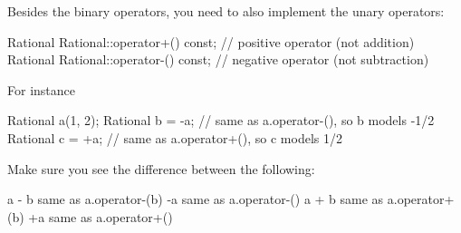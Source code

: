 Besides the binary operators, you need to also implement the unary operators:
{\small
\begin{console}
Rational Rational::operator+() const; // positive operator (not addition)
Rational Rational::operator-() const; // negative operator (not subtraction)
\end{console}
}
For instance
{\small
\begin{console}
Rational a(1, 2);
Rational b = -a; // same as a.operator-(), so b models -1/2
Rational c = +a; // same as a.operator+(), so c models 1/2
\end{console}
}
Make sure you see the difference between the following:
{\small
\begin{console}[commandchars=\\\{\}]
    a - b   \textrm{same as}    a.operator-(b)
    -a      \textrm{same as}    a.operator-()
    a + b   \textrm{same as}    a.operator+(b)
    +a      \textrm{same as}    a.operator+()
\end{console}
}



